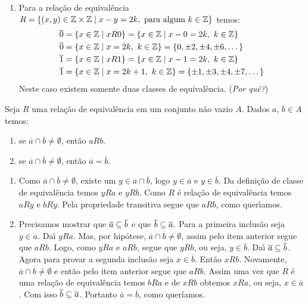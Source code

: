 \begin{exemplos}
\begin{enumerate}
		\item Para a relação de equivalência $R = \{(x,y)\in \mathbb{Z} \times \mathbb{Z} \mid x - y = 2k, \mbox{ para algum } k \in \mathbb{Z}\}$ temos:
		\begin{align*}
			\overline{0} &= \{x \in \mathbb{Z} \mid xR0 \} = \{x \in \mathbb{Z} \mid x - 0 = 2k,\ k \in \mathbb{Z}\} \\ 
			\overline{0} &= \{x \in \mathbb{Z} \mid x = 2k,\ k \in \mathbb{Z}\} = \{0, \pm 2, \pm 4, \pm 6, \dots\}\\
			\overline{1} &= \{x \in \mathbb{Z} \mid xR1 \} = \{x \in \mathbb{Z} \mid x - 1 = 2k,\ k \in \mathbb{Z}\} \\
			\overline{1} &= \{x \in \mathbb{Z} \mid x = 2k + 1,\ k \in \mathbb{Z}\} = \{\pm 1, \pm 3, \pm 4, \pm 7, \dots\}\\
		\end{align*}
		Neste caso existem somente duas classes de equivalência. (\textit{Por quê?})
	\end{enumerate}
\end{exemplos}

\begin{proposicao}
	Seja $R$ uma rela{\c c}{\~a}o de equival{\^e}ncia em um conjunto n{\~a}o vazio $A$. Dados $a$, $b \in A$ temos:
	\begin{enumerate}
		\item se $\overline{a} \cap \overline{b} \ne \emptyset$, ent{\~a}o $aRb$.
		\item se  $\overline{a} \cap \overline{b} \neq \emptyset$, ent{\~a}o $\overline{a} = \overline{b}$.
	\end{enumerate}
\end{proposicao}
\begin{prova}
	\begin{enumerate}
		\item Como  $\overline{a} \cap \overline{b} \ne \emptyset$, existe um $y \in \overline{a} \cap \overline{b}$, logo $y \in \overline{a}$ e $y \in \overline{b}$. Da defini{\c c}{\~a}o de classe de equival{\^e}ncia temos $yRa$ e $yRb$. Como $R$ {\'e} rela{\c c}{\~a}o de equival{\^e}ncia temos $aRy$ e $bRy$. Pela propriedade transitiva segue que $aRb$, como quer{\'\i}amos.

		\item Precisamos mostrar que $\overline{a} \subseteq \overline{b}$ e que $\overline{b} \subseteq \overline{a}.$ Para a primeira inclusão seja $y \in \overline{a}$. Da{\'\i} $yRa$. Mas, por hipótese, $\overline{a}\cap\overline{b}\neq\emptyset$, assim pelo item anterior segue que $aRb$. Logo, como $yRa$ e $aRb$, segue que $yRb$, ou seja, $y \in \overline{b}$. Da{\'\i} $\overline{a}\subseteq\overline{b}$. Agora para provar a segunda inclusão seja $x \in \overline{b}$. Então $xRb$. Novamente, $\overline{a} \cap \overline{b} \ne \emptyset$ e então pelo item anterior segue que $aRb$. Assim uma vez que $R$ é uma relação de equivalência temos $bRa$ e de $xRb$ obtemos $xRa$, ou seja, $x \in \overline{a}$. Com isso $\overline{b} \subseteq \overline{a}$. Portanto $\overline{a} = \overline{b}$, como queríamos.
	\end{enumerate}
\end{prova}

